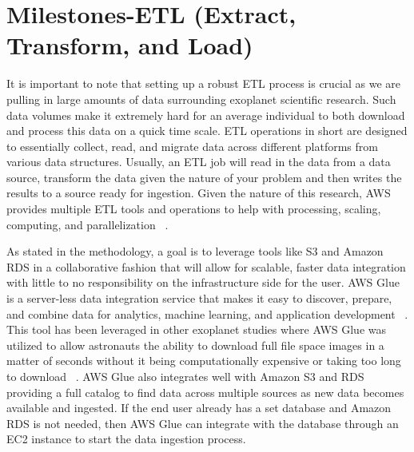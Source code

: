 \documentclass[letterpaper, 10 pt, conference]{ieeeconf}  %
\begin{document}
\section{Milestones-ETL (Extract, Transform, and Load)}

It is important to note that setting up a robust ETL process is crucial as we are pulling in large amounts of data surrounding exoplanet scientific research. Such data volumes make it extremely hard for an average individual to both download and process this data on a quick time scale. ETL operations in short are designed to essentially collect, read, and migrate data across different platforms from various data structures. Usually, an ETL job will read in the data from a data source, transform the data given the nature of your problem and then writes the results to a source ready for ingestion. Given the nature of this research, AWS provides multiple ETL tools and operations to help with processing, scaling, computing, and parallelization ~\cite{AmazonGlue}.

As stated in the methodology, a goal is to leverage tools like S3 and Amazon RDS in a collaborative fashion that will allow for scalable, faster data integration with little to no responsibility on the infrastructure side for the user. AWS Glue is a server-less data integration service that makes it easy to discover, prepare, and combine data for analytics, machine learning, and application development ~\cite{AmazonGlue}. This tool has been leveraged in other exoplanet studies where AWS Glue was utilized to allow astronauts  the ability to download full file space images in a matter of seconds without it being computationally expensive or taking too long to download ~\cite{AmazonGlueUsage}. AWS Glue also integrates well with Amazon S3 and RDS providing a full catalog to find data across multiple sources as new data becomes available and ingested. If the end user already has a set database and Amazon RDS is not needed, then AWS Glue can integrate with the database through an EC2 instance to start the data ingestion process.
\end{document}
